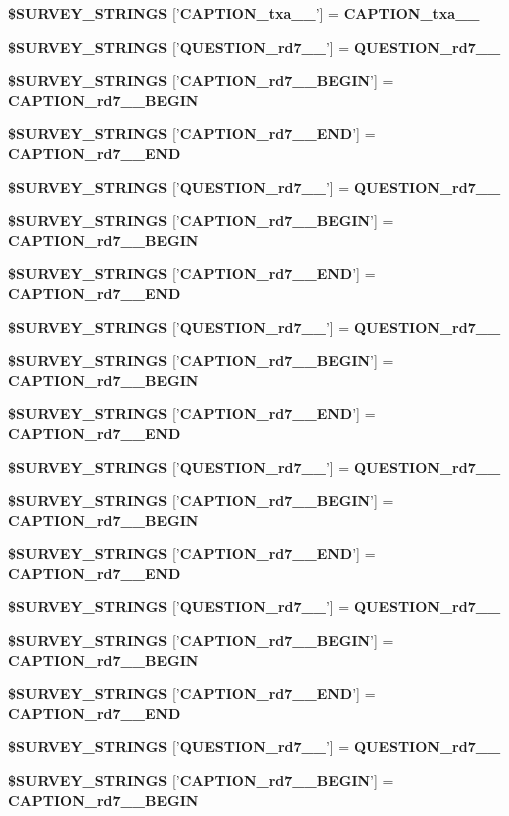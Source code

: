 \begin{CompactItemize}
{\bf \$SURVEY\_\-STRINGS} ['{\bf CAPTION\_\-txa\_\_\-}'] = {\bf CAPTION\_\-txa\_\_\-}
\item 
{\bf \$SURVEY\_\-STRINGS} ['{\bf QUESTION\_\-rd7\_\_\-}'] = {\bf QUESTION\_\-rd7\_\_\-}
\item 
{\bf \$SURVEY\_\-STRINGS} ['{\bf CAPTION\_\-rd7\_\_\-BEGIN}'] = {\bf CAPTION\_\-rd7\_\_\-BEGIN}
\item 
{\bf \$SURVEY\_\-STRINGS} ['{\bf CAPTION\_\-rd7\_\_\-END}'] = {\bf CAPTION\_\-rd7\_\_\-END}
\item 
{\bf \$SURVEY\_\-STRINGS} ['{\bf QUESTION\_\-rd7\_\_\-}'] = {\bf QUESTION\_\-rd7\_\_\-}
\item 
{\bf \$SURVEY\_\-STRINGS} ['{\bf CAPTION\_\-rd7\_\_\-BEGIN}'] = {\bf CAPTION\_\-rd7\_\_\-BEGIN}
\item 
{\bf \$SURVEY\_\-STRINGS} ['{\bf CAPTION\_\-rd7\_\_\-END}'] = {\bf CAPTION\_\-rd7\_\_\-END}
\item 
{\bf \$SURVEY\_\-STRINGS} ['{\bf QUESTION\_\-rd7\_\_\-}'] = {\bf QUESTION\_\-rd7\_\_\-}
\item 
{\bf \$SURVEY\_\-STRINGS} ['{\bf CAPTION\_\-rd7\_\_\-BEGIN}'] = {\bf CAPTION\_\-rd7\_\_\-BEGIN}
\item 
{\bf \$SURVEY\_\-STRINGS} ['{\bf CAPTION\_\-rd7\_\_\-END}'] = {\bf CAPTION\_\-rd7\_\_\-END}
\item 
{\bf \$SURVEY\_\-STRINGS} ['{\bf QUESTION\_\-rd7\_\_\-}'] = {\bf QUESTION\_\-rd7\_\_\-}
\item 
{\bf \$SURVEY\_\-STRINGS} ['{\bf CAPTION\_\-rd7\_\_\-BEGIN}'] = {\bf CAPTION\_\-rd7\_\_\-BEGIN}
\item 
{\bf \$SURVEY\_\-STRINGS} ['{\bf CAPTION\_\-rd7\_\_\-END}'] = {\bf CAPTION\_\-rd7\_\_\-END}
\item 
{\bf \$SURVEY\_\-STRINGS} ['{\bf QUESTION\_\-rd7\_\_\-}'] = {\bf QUESTION\_\-rd7\_\_\-}
\item 
{\bf \$SURVEY\_\-STRINGS} ['{\bf CAPTION\_\-rd7\_\_\-BEGIN}'] = {\bf CAPTION\_\-rd7\_\_\-BEGIN}
\item 
{\bf \$SURVEY\_\-STRINGS} ['{\bf CAPTION\_\-rd7\_\_\-END}'] = {\bf CAPTION\_\-rd7\_\_\-END}
\item 
{\bf \$SURVEY\_\-STRINGS} ['{\bf QUESTION\_\-rd7\_\_\-}'] = {\bf QUESTION\_\-rd7\_\_\-}
\item 
{\bf \$SURVEY\_\-STRINGS} ['{\bf CAPTION\_\-rd7\_\_\-BEGIN}'] = {\bf CAPTION\_\-rd7\_\_\-BEGIN}
\item 

\end{CompactItemize}
